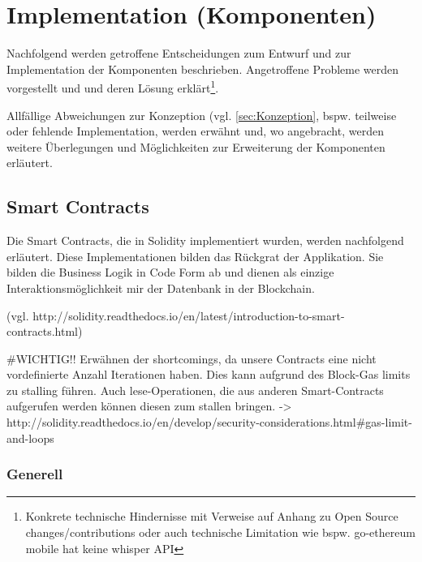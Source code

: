 \section{Implementation (Komponenten)}
\label{sec:Implementation}
Nachfolgend werden getroffene Entscheidungen zum Entwurf und zur Implementation der Komponenten beschrieben. Angetroffene Probleme werden vorgestellt und und deren Lösung erklärt\footnote{Konkrete technische Hindernisse mit Verweise auf Anhang zu Open Source changes/contributions oder auch technische Limitation wie bspw. go-ethereum mobile hat keine whisper API}.

Allfällige Abweichungen zur Konzeption (vgl. \ref{sec:Konzeption}, bspw. teilweise oder fehlende Implementation, werden erwähnt und, wo angebracht, werden weitere Überlegungen und Möglichkeiten zur Erweiterung der Komponenten erläutert.

\subsection{Smart Contracts}
\label{subsec:Smart_Contracts}
Die Smart Contracts, die in Solidity implementiert wurden, werden nachfolgend erläutert. Diese Implementationen bilden das Rückgrat der Applikation. Sie bilden die Business Logik in Code Form ab und dienen als einzige Interaktionsmöglichkeit mir der Datenbank in der Blockchain.

(vgl. http://solidity.readthedocs.io/en/latest/introduction-to-smart-contracts.html)

\#WICHTIG!!
Erwähnen der shortcomings, da unsere Contracts eine nicht vordefinierte Anzahl Iterationen haben. Dies kann aufgrund des Block-Gas limits zu stalling führen. Auch lese-Operationen, die aus anderen Smart-Contracts aufgerufen werden können diesen zum stallen bringen. -> http://solidity.readthedocs.io/en/develop/security-considerations.html\#gas-limit-and-loops

\subsubsection{Generell}
